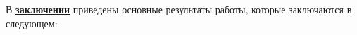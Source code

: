 В \underline{\textbf{заключении}} приведены основные результаты работы, которые заключаются в следующем:\\




